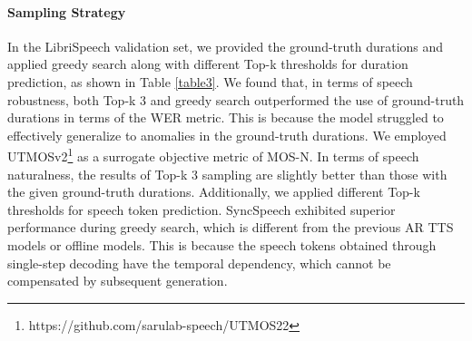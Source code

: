 \paragraph{Sampling Strategy} In the LibriSpeech validation set, we provided the ground-truth durations and applied greedy search along with different Top-k thresholds for duration prediction, as shown in Table \ref{table3}. We found that, in terms of speech robustness, both Top-k 3 and greedy search outperformed the use of ground-truth durations in terms of the WER metric. This is because the model struggled to effectively generalize to anomalies in the ground-truth durations. We employed
UTMOSv2\footnote{https://github.com/sarulab-speech/UTMOS22} as a surrogate objective metric of MOS-N. In terms of speech naturalness, the results of Top-k 3 sampling are slightly better than those with the given ground-truth durations.  Additionally, we applied different Top-k thresholds for speech token prediction. SyncSpeech exhibited superior performance during greedy search, which is different from the previous AR TTS models or offline models. This is because the speech tokens obtained through single-step decoding have the temporal dependency, which cannot be compensated by subsequent generation. 


\begin{table}[]
\centering
{}
\caption{Performance across various Top-k thresholds for duration prediction and speech token prediction on the LibriTTS validation set.}
\label{table3}
\end{table}

